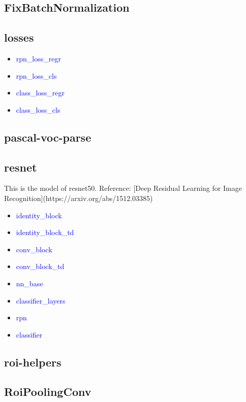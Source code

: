 \documentclass[UTF8,a4paper,11pt]{ctexart}
\begin{document}
    \subsection{FixBatchNormalization}
    \subsection{losses}
        \begin{itemize}
            \item {\textcolor{blue}{rpn\_loss\_regr}}
            \item {\textcolor{blue}{rpn\_loss\_cls}}
            \item {\textcolor{blue}{class\_loss\_regr}}
            \item {\textcolor{blue}{class\_loss\_cls}}
        \end{itemize}
    \subsection{pascal-voc-parse}
    \subsection{resnet}
    This is the model of resnet50. Reference: [Deep Residual Learning for Image Recognition](https://arxiv.org/abs/1512.03385)
        \begin{itemize}
            \item {\textcolor{blue}{identity\_block}}
            \item {\textcolor{blue}{identity\_block\_td}}
            \item {\textcolor{blue}{conv\_block}}
            \item {\textcolor{blue}{conv\_block\_td}}
            \item {\textcolor{blue}{nn\_base}}
            \item {\textcolor{blue}{classifier\_layers}}
            \item {\textcolor{blue}{rpn}}
            \item {\textcolor{blue}{classifier}}
            
        \end{itemize}
    \subsection{roi-helpers}
    \subsection{RoiPoolingConv}
\end{document}
